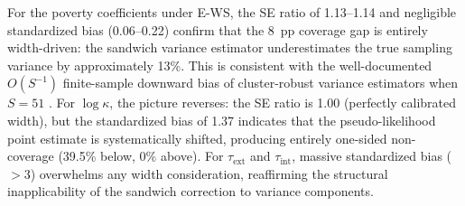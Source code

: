 For the poverty coefficients under E-WS, the SE ratio of 1.13--1.14
and negligible standardized bias (0.06--0.22) confirm that the 8~pp
coverage gap is entirely width-driven: the sandwich variance estimator
underestimates the true sampling variance by approximately 13\%.
This is consistent with the well-documented $O(S^{-1})$ finite-sample
downward bias of cluster-robust variance estimators when $S = 51$
\citep{Binder1983}.  For $\log\kappa$, the picture reverses: the SE
ratio is 1.00 (perfectly calibrated width), but the standardized bias
of 1.37 indicates that the pseudo-likelihood point estimate is
systematically shifted, producing entirely one-sided non-coverage
(39.5\% below, 0\% above).  For $\tau_{\mathrm{ext}}$ and
$\tau_{\mathrm{int}}$, massive standardized bias ($> 3$) overwhelms
any width consideration, reaffirming the structural inapplicability of
the sandwich correction to variance components.
